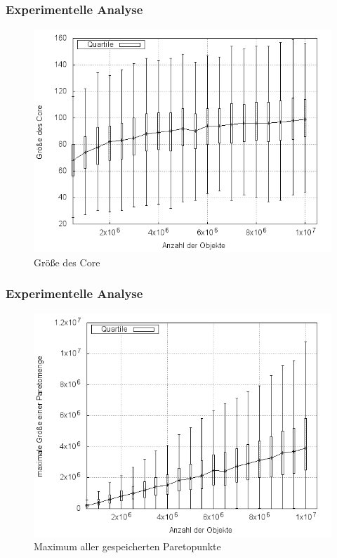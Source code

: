 \documentclass{presentation}
\begin{document}
\begin{frame}
    \frametitle{Experimentelle Analyse}
    \begin{figure}[!htb]
        \centering
        \includegraphics[scale=0.4]{res/core_size.png}
        \caption{Größe des Core}
        \label{fig:core_size}
    \end{figure}
\end{frame}



\begin{frame}
    \frametitle{Experimentelle Analyse}
    \begin{figure}[!htb]
        \centering
        \includegraphics[scale=0.4]{res/core_final_pp.png}
        \caption{Maximum aller gespeicherten Paretopunkte}
        \label{fig:core_final_pp}
    \end{figure}
\end{frame}
\end{document}
